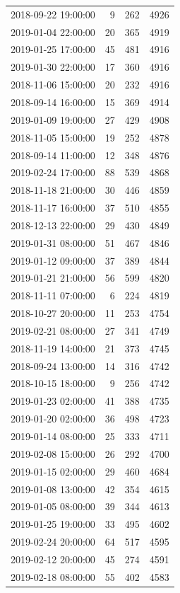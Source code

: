 \begin{tabular}{lrrr}
2018-09-22 19:00:00 & 9 & 262 & 4926 \\
2019-01-04 22:00:00 & 20 & 365 & 4919 \\
2019-01-25 17:00:00 & 45 & 481 & 4916 \\
2019-01-30 22:00:00 & 17 & 360 & 4916 \\
2018-11-06 15:00:00 & 20 & 232 & 4916 \\
2018-09-14 16:00:00 & 15 & 369 & 4914 \\
2019-01-09 19:00:00 & 27 & 429 & 4908 \\
2018-11-05 15:00:00 & 19 & 252 & 4878 \\
2018-09-14 11:00:00 & 12 & 348 & 4876 \\
2019-02-24 17:00:00 & 88 & 539 & 4868 \\
2018-11-18 21:00:00 & 30 & 446 & 4859 \\
2018-11-17 16:00:00 & 37 & 510 & 4855 \\
2018-12-13 22:00:00 & 29 & 430 & 4849 \\
2019-01-31 08:00:00 & 51 & 467 & 4846 \\
2019-01-12 09:00:00 & 37 & 389 & 4844 \\
2019-01-21 21:00:00 & 56 & 599 & 4820 \\
2018-11-11 07:00:00 & 6 & 224 & 4819 \\
2018-10-27 20:00:00 & 11 & 253 & 4754 \\
2019-02-21 08:00:00 & 27 & 341 & 4749 \\
2018-11-19 14:00:00 & 21 & 373 & 4745 \\
2018-09-24 13:00:00 & 14 & 316 & 4742 \\
2018-10-15 18:00:00 & 9 & 256 & 4742 \\
2019-01-23 02:00:00 & 41 & 388 & 4735 \\
2019-01-20 02:00:00 & 36 & 498 & 4723 \\
2019-01-14 08:00:00 & 25 & 333 & 4711 \\
2019-02-08 15:00:00 & 26 & 292 & 4700 \\
2019-01-15 02:00:00 & 29 & 460 & 4684 \\
2019-01-08 13:00:00 & 42 & 354 & 4615 \\
2019-01-05 08:00:00 & 39 & 344 & 4613 \\
2019-01-25 19:00:00 & 33 & 495 & 4602 \\
2019-02-24 20:00:00 & 64 & 517 & 4595 \\
2019-02-12 20:00:00 & 45 & 274 & 4591 \\
2019-02-18 08:00:00 & 55 & 402 & 4583 \\

\end{tabular}
